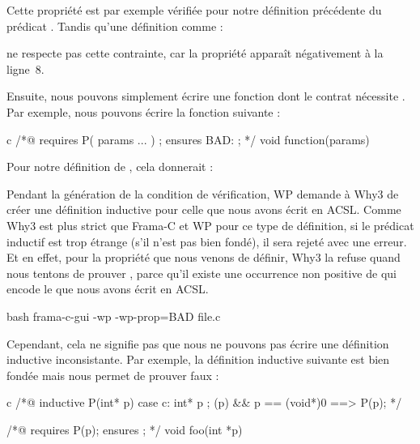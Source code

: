 Cette propriété est par exemple vérifiée pour notre définition précédente du
prédicat . Tandis qu'une définition comme :




ne respecte pas cette contrainte, car la propriété 
apparaît négativement à la ligne~8.


Ensuite, nous pouvons simplement écrire une fonction dont le contrat nécessite
. Par exemple, nous pouvons écrire la fonction suivante :



\begin{CodeBlock}{c}
/*@
  requires P( params ... ) ;
  ensures  BAD: \false ;
*/ void function(params){

}
\end{CodeBlock}


Pour notre définition de , cela donnerait :




Pendant la génération de la condition de vérification, WP demande à Why3 de
créer une définition inductive pour celle que nous avons écrit en ACSL.
Comme Why3 est plus strict que Frama-C et WP pour ce type de définition,
si le prédicat inductif est trop étrange (s'il n'est pas bien fondé), il
sera rejeté avec une erreur. Et en effet, pour la propriété
 que nous venons de définir, Why3 la refuse quand
nous tentons de prouver , parce
qu'il existe une occurrence non positive de 
qui encode le  que nous avons écrit en ACSL.

\begin{CodeBlock}{bash}
frama-c-gui -wp -wp-prop=BAD file.c
\end{CodeBlock}




Cependant, cela ne signifie pas que nous ne pouvons pas écrire une définition
inductive inconsistante. Par exemple, la définition inductive suivante est bien
fondée mais nous permet de prouver faux :


\begin{CodeBlock}{c}
/*@ inductive P(int* p){
      case c: \forall int* p ; \valid(p) && p == (void*)0 ==> P(p);
    }
*/

/*@ requires P(p);
    ensures \false ; */
void foo(int *p){}
\end{CodeBlock}


